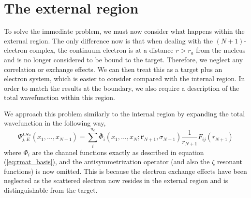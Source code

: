 \section{The external region}\label{sec:external}
To solve the immediate problem, we must now consider what happens within the external region. The only difference now is that when dealing with the $(N+1)$-electron complex, the continuum electron is at a distance $r>r_a$ from the nucleus and is no longer considered to be bound to the target. Therefore, we neglect any correlation or exchange effects. We can then treat this as a target plus an electron system, which is easier to consider compared with the internal region. In order to match the results at the boundary, we also require a description of the total wavefunction within this region.

We approach this problem similarly to the internal region by expanding the total wavefunction in the following way,
\begin{equation}\label{eq:rmat_extwave}
\Psi_{j,E}^{LS\pi}(x_1, ... , x_{N+1})=\sum_i^{n_c}\bar{\Phi}_i(x_1, ..., x_N; \boldsymbol{\hat{r}}_{N+1},\sigma_{N+1})\frac{1}{r_{N+1}}F_{ij}(r_{N+1})
\end{equation}
where $\bar{\Phi}_i$ are the channel functions exactly as described in equation (\ref{eq:rmat_basis}), and the antisymmetrization operator (and also the $\zeta$ resonant functions) is now omitted. This is because the electron exchange effects have been neglected as the scattered electron now resides in the external region and is distinguishable from the target.

